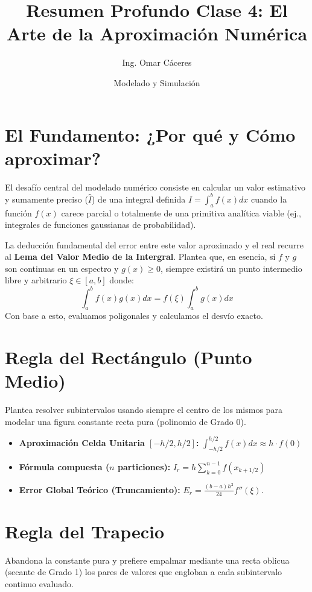\documentclass[12pt,a4paper]{article}
\title{\textbf{Resumen Profundo Clase 4: El Arte de la Aproximación Numérica}}
\author{Ing. Omar Cáceres \and Modelado y Simulación}
\date{}
\begin{document}
\maketitle

\section{El Fundamento: ¿Por qué y Cómo aproximar?}
El desafío central del modelado numérico consiste en calcular un valor estimativo y sumamente preciso ($\hat{I}$) de una integral definida $I = \int_{a}^{b} f(x) dx$ cuando la función $f(x)$ carece parcial o totalmente de una primitiva analítica viable (ej., integrales de funciones gaussianas de probabilidad).

La deducción fundamental del error entre este valor aproximado y el real recurre al \textbf{Lema del Valor Medio de la Intergral}. Plantea que, en esencia, si $f$ y $g$ son continuas en un espectro y $g(x) \geq 0$, siempre existirá un punto intermedio libre y arbitrario $\xi \in [a, b]$ donde:
\begin{equation}
\int_{a}^{b} f(x)g(x) dx = f(\xi) \int_{a}^{b} g(x) dx
\end{equation}
Con base a esto, evaluamos poligonales y calculamos el desvío exacto.

\section{Regla del Rectángulo (Punto Medio)}
Plantea resolver subintervalos usando siempre el centro de los mismos para modelar una figura constante recta pura (polinomio de Grado 0).
\begin{itemize}
    \item \textbf{Aproximación Celda Unitaria $[-h/2, h/2]$:} $\int_{-h/2}^{h/2} f(x) dx \approx h \cdot f(0)$
    \item \textbf{Fórmula compuesta ($n$ particiones):} $I_r = h \sum_{k=0}^{n-1} f(x_{k+1/2})$
    \item \textbf{Error Global Teórico (Truncamiento):} $E_r = \frac{(b-a) h^2}{24} f''(\xi)$.
\end{itemize}

\section{Regla del Trapecio}
Abandona la constante pura y prefiere empalmar mediante una recta oblicua (secante de Grado 1) los pares de valores que engloban a cada subintervalo continuo evaluado.
\end{document}
